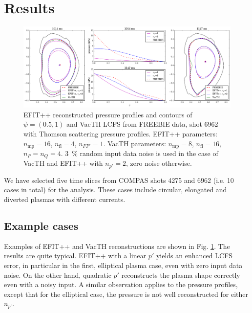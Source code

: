 
\section{Results} %
\label{sec:results}

\begin{figure}[!htb]
\centering   %
\hfill{}
\includegraphics[width=18cm]{figures/example_6962.pdf}
\hfill{}
\caption{EFIT++ reconstructed pressure profiles and contours of $\bar\psi=\left(0.5,1\right)$ and VacTH LCFS from FREEBIE data, shot 6962 with Thomson scattering pressure profiles. EFIT++ parameters: $n_\mathrm{mp} = 16$, $n_\mathrm{fl} = 4$, $n_{FF'} = 1$. VacTH parameters: $n_\mathrm{mp} = 8$, $n_\mathrm{fl} = 16$, $n_P = n_Q = 4$. 3~\% random input data noise is used in the case of VacTH and EFIT++ with $n_{p'} = 2$, zero noise otherwise.}
\label{fig:ex6962}
\end{figure}


We have selected five time slices from COMPAS shots 4275 and 6962 (i.e. 10 cases in total) for the analysis. These cases include circular, elongated and diverted plasmas with different currents. 

\subsection{Example cases}

Examples of EFIT++ and VacTH reconstructions are shown in Fig. \ref{fig:ex6962}. The results are quite typical. EFIT++ with a linear $p'$ yields an enhanced LCFS error, in particular in the first, elliptical plasma case, even with zero input data noise. On the other hand, quadratic $p'$ reconstructs the plasma shape correctly even with a noisy input. A similar observation applies to the pressure profiles, except that for the elliptical case, the pressure is not well reconstructed for either $n_{p'}$. 

